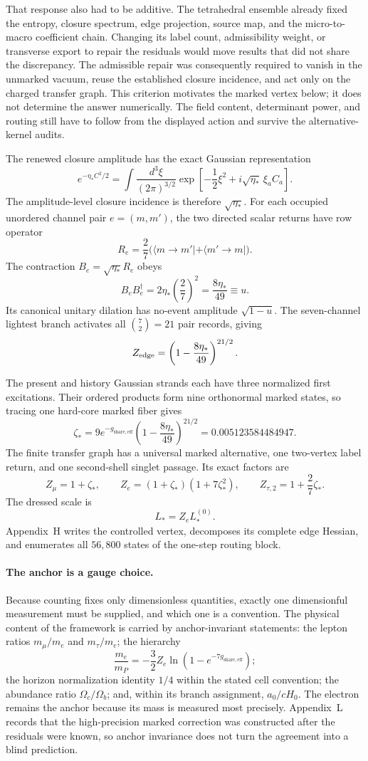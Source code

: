 \documentclass[11pt]{article}
\begin{document}
That response also had to be additive. The tetrahedral ensemble already fixed the entropy, closure spectrum, edge projection, source map, and the micro-to-macro coefficient chain. Changing its label count, admissibility weight, or transverse export to repair the residuals would move results that did not share the discrepancy. The admissible repair was consequently required to vanish in the unmarked vacuum, reuse the established closure incidence, and act only on the charged transfer graph. This criterion motivates the marked vertex below; it does not determine the answer numerically. The field content, determinant power, and routing still have to follow from the displayed action and survive the alternative-kernel audits.

The renewed closure amplitude has the exact Gaussian representation
\[
e^{-\eta_*C^2/2}
=\int\frac{d^3\xi}{(2\pi)^{3/2}}
\exp\!\left[-\frac12\xi^2+i\sqrt{\eta_*}\,\xi_aC_a\right].
\]
The amplitude-level closure incidence is therefore $\sqrt{\eta_*}$. For each occupied unordered channel pair $e=(m,m')$, the two directed scalar returns have row operator
\[
R_e=\frac27\bigl(\langle m\!\to\!m'|+\langle m'\!\to\!m|\bigr).
\]
The contraction $B_e=\sqrt{\eta_*}R_e$ obeys
\[
B_eB_e^\dagger=2\eta_*\left(\frac27\right)^2
=\frac{8\eta_*}{49}\equiv u.
\]
Its canonical unitary dilation has no-event amplitude $\sqrt{1-u}$. The seven-channel lightest branch activates all $\binom72=21$ pair records, giving
\[
Z_{\rm edge}=\left(1-\frac{8\eta_*}{49}\right)^{21/2}.
\]

The present and history Gaussian strands each have three normalized first excitations. Their ordered products form nine orthonormal marked states, so tracing one hard-core marked fiber gives
\[
\boxed{\zeta_*
=9e^{-g_{\mathrm{share,eff}}}
\left(1-\frac{8\eta_*}{49}\right)^{21/2}}
=0.005123584484947.
\]
The finite transfer graph has a universal marked alternative, one two-vertex label return, and one second-shell singlet passage. Its exact factors are
\[
Z_\mu=1+\zeta_*,
\qquad
Z_e=(1+\zeta_*)(1+7\zeta_*^2),
\qquad
Z_{\tau,2}=1+\frac27\zeta_*.
\]
The dressed scale is
\[
\boxed{L_*=Z_eL_*^{(0)}}.
\]
Appendix~H writes the controlled vertex, decomposes its complete edge Hessian, and enumerates all $56{,}800$ states of the one-step routing block.

\paragraph{The anchor is a gauge choice.}
Because counting fixes only dimensionless quantities, exactly one dimensionful measurement must be supplied, and which one is a convention. The physical content of the framework is carried by anchor-invariant statements: the lepton ratios $m_\mu/m_e$ and $m_\tau/m_e$; the hierarchy
\[
\frac{m_e}{m_P}
=-\frac32Z_e\ln(1-e^{-7g_{\mathrm{share,eff}}});
\]
the horizon normalization identity $1/4$ within the stated cell convention; the abundance ratio $\Omega_c/\Omega_b$; and, within its branch assignment, $a_0/cH_0$. The electron remains the anchor because its mass is measured most precisely. Appendix~L records that the high-precision marked correction was constructed after the residuals were known, so anchor invariance does not turn the agreement into a blind prediction.
\end{document}
